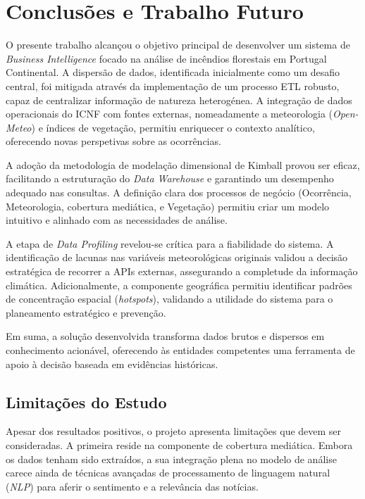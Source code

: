 \section{Conclusões e Trabalho Futuro} \label{sec:concusoes-e-trabalho-futuro}

O presente trabalho alcançou o objetivo principal de desenvolver um sistema de \textit{Business Intelligence} focado na análise de incêndios florestais em Portugal Continental.
A dispersão de dados, identificada inicialmente como um desafio central, foi mitigada através da implementação de um processo ETL robusto, capaz de centralizar informação de natureza heterogénea.
A integração de dados operacionais do ICNF com fontes externas, nomeadamente a meteorologia (\textit{Open-Meteo}) e índices de vegetação, permitiu enriquecer o contexto analítico, oferecendo novas perspetivas sobre as ocorrências.

A adoção da metodologia de modelação dimensional de Kimball provou ser eficaz, facilitando a estruturação do \textit{Data Warehouse} e garantindo um desempenho adequado nas consultas. A definição clara dos processos de negócio (Ocorrência, Meteorologia, cobertura mediática, e Vegetação) permitiu criar um modelo intuitivo e alinhado com as necessidades de análise.

A etapa de \textit{Data Profiling} revelou-se crítica para a fiabilidade do sistema. A identificação de lacunas nas variáveis meteorológicas originais validou a decisão estratégica de recorrer a APIs externas, assegurando a completude da informação climática. Adicionalmente, a componente geográfica permitiu identificar padrões de concentração espacial (\textit{hotspots}), validando a utilidade do sistema para o planeamento estratégico e prevenção.

Em suma, a solução desenvolvida transforma dados brutos e dispersos em conhecimento acionável, oferecendo às entidades competentes uma ferramenta de apoio à decisão baseada em evidências históricas.

\subsection{Limitações do Estudo}
Apesar dos resultados positivos, o projeto apresenta limitações que devem ser consideradas.
A primeira reside na componente de cobertura mediática. Embora os dados tenham sido extraídos, a sua integração plena no modelo de análise carece ainda de técnicas avançadas de processamento de linguagem natural (\textit{NLP}) para aferir o sentimento e a relevância das notícias.


